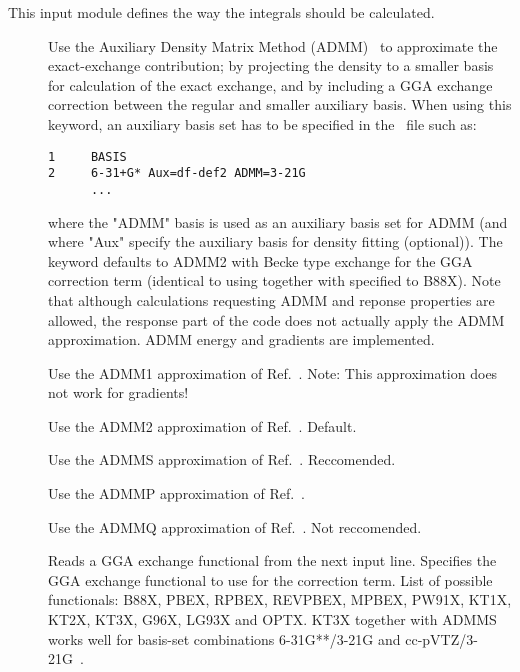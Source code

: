 This input module defines the way the integrals should be calculated.
\begin{description}

\item[] Use the Auxiliary Density Matrix Method (ADMM)~\cite{ADMM:2010,ADMM:2014} 
to approximate the exact-exchange contribution; by projecting the density to a smaller
basis for calculation of the exact exchange, and by including a GGA exchange correction 
between the regular and smaller auxiliary basis. When using this keyword, an auxiliary 
basis set has to be specified in the \mol\ file such as:
\begin{verbatim}
1     BASIS
2     6-31+G* Aux=df-def2 ADMM=3-21G
      ...
\end{verbatim} 
where the "ADMM" basis is used as an auxiliary basis set for ADMM (and where "Aux" 
specify the auxiliary basis for density fitting (optional)). 
The  keyword defaults to ADMM2 with Becke type exchange for the GGA 
correction term (identical to using  together with  
specified to B88X).
Note that although calculations requesting ADMM and reponse properties are allowed, 
the response part of the code does not actually apply the ADMM approximation.
ADMM energy and gradients are implemented.

\item[] Use the ADMM1 approximation of Ref.~\cite{ADMM:2010}. Note: This 
approximation does not work for gradients!

\item[] Use the ADMM2 approximation of Ref.~\cite{ADMM:2010}. Default.

\item[] Use the ADMMS approximation of Ref.~\cite{ADMM:2014}.
Reccomended.

\item[] Use the ADMMP approximation of Ref.~\cite{ADMM:2014}.

\item[] Use the ADMMQ approximation of Ref.~\cite{ADMM:2014}.
Not reccomended.

\item[] Reads a GGA exchange functional from the next input line. 
Specifies the GGA exchange functional to use for the correction 
term. List of possible functionals: B88X, PBEX, RPBEX, REVPBEX, MPBEX, PW91X, 
KT1X, KT2X, KT3X, G96X, LG93X and OPTX. KT3X together with ADMMS works well for 
basis-set combinations 6-31G**/3-21G and cc-pVTZ/3-21G~\cite{ADMM:2014}.


\end{description}
